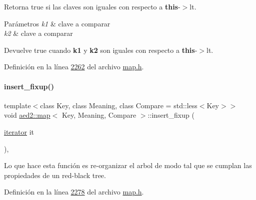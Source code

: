 Retorna true si las claves son iguales con respecto a {\bfseries this}-\/$>$lt. 


\begin{DoxyParams}{Parámetros}
{\em k1} & clave a comparar \\
\hline
{\em k2} & clave a comparar \\
\hline
\end{DoxyParams}
\begin{DoxyReturn}{Devuelve}
true cuando {\bfseries k1} y {\bfseries k2} son iguales con respecto a {\bfseries this}-\/$>$lt. 
\end{DoxyReturn}


Definición en la línea \hyperlink{map_8h_source_l02262}{2262} del archivo \hyperlink{map_8h_source}{map.\+h}.

\mbox{\label{classaed2_1_1map_ac9197851fe5b217d45d58bbaf3612c75_ac9197851fe5b217d45d58bbaf3612c75}} 
\paragraph{\texorpdfstring{insert\+\_\+fixup()}{insert\_fixup()}}
{\footnotesize\ttfamily template$<$class Key, class Meaning, class Compare = std\+::less$<$\+Key$>$$>$ \\
void \hyperlink{classaed2_1_1map}{aed2\+::map}$<$ Key, Meaning, Compare $>$\+::insert\+\_\+fixup (\begin{DoxyParamCaption}\item[{\hyperlink{classaed2_1_1map_1_1iterator}{iterator}}]{it }\end{DoxyParamCaption})\hspace{0.3cm}{\ttfamily [inline]}, {\ttfamily [private]}}

Lo que hace esta función es re-\/organizar el arbol de modo tal que se cumplan las propiedades de un red-\/black tree. 

Definición en la línea \hyperlink{map_8h_source_l02278}{2278} del archivo \hyperlink{map_8h_source}{map.\+h}.

\mbox{\label{classaed2_1_1map_a94f2862ada0c9ed4f4457eac42ea8f23_a94f2862ada0c9ed4f4457eac42ea8f23}} 
